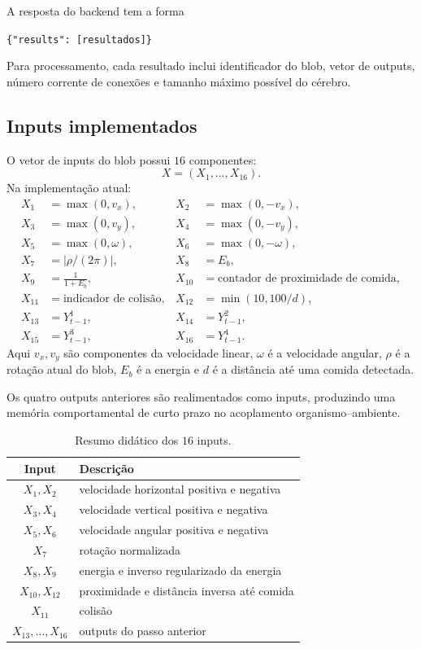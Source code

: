 \documentclass[12pt,a4paper,fleqn]{article}
\begin{document}
A resposta do backend tem a forma
\begin{center}
\texttt{\{"results": [resultados]\}}
\end{center}
Para processamento, cada resultado inclui identificador do blob, vetor de outputs, número corrente de conexões e tamanho máximo possível do cérebro.

\subsection{Inputs implementados}

O vetor de inputs do blob possui $16$ componentes:
$$
	X=(X_1,\ldots,X_{16}).
$$
Na implementação atual:
$$
\begin{aligned}
X_1 &= \max(0,v_x),&
X_2 &= \max(0,-v_x),\\
X_3 &= \max(0,v_y),&
X_4 &= \max(0,-v_y),\\
X_5 &= \max(0,\omega),&
X_6 &= \max(0,-\omega),\\
X_7 &= |\rho/(2\pi)|,&
X_8 &= E_b,\\
X_9 &= \frac{1}{1+E_b},&
X_{10} &= \text{contador de proximidade de comida},\\
X_{11} &= \text{indicador de colisão},&
X_{12} &= \min(10,100/d),\\
X_{13} &= Y_{t-1}^1,&
X_{14} &= Y_{t-1}^2,\\
X_{15} &= Y_{t-1}^3,&
X_{16} &= Y_{t-1}^4.
\end{aligned}
$$
Aqui $v_x,v_y$ são componentes da velocidade linear, $\omega$ é a velocidade angular, $\rho$ é a rotação atual do blob, $E_b$ é a energia e $d$ é a distância até uma comida detectada.

Os quatro outputs anteriores são realimentados como inputs, produzindo uma memória comportamental de curto prazo no acoplamento organismo--ambiente.

\begin{table}[H]
\centering
\caption{Resumo didático dos $16$ inputs.}
\label{tab:inputs-resumo}
\begin{tabular}{cl}
\toprule
Input & Descrição \\
\midrule
$X_1,X_2$ & velocidade horizontal positiva e negativa \\
$X_3,X_4$ & velocidade vertical positiva e negativa \\
$X_5,X_6$ & velocidade angular positiva e negativa \\
$X_7$ & rotação normalizada \\
$X_8,X_9$ & energia e inverso regularizado da energia \\
$X_{10},X_{12}$ & proximidade e distância inversa até comida \\
$X_{11}$ & colisão \\
$X_{13},\ldots,X_{16}$ & outputs do passo anterior \\
\bottomrule
\end{tabular}
\end{table}
\end{document}
